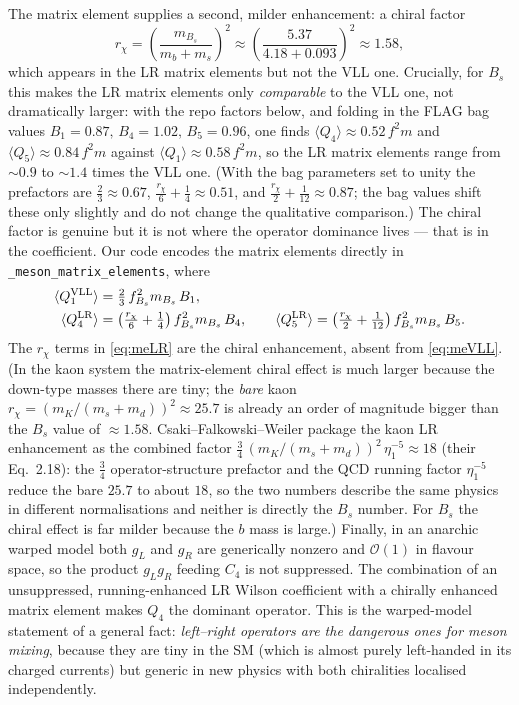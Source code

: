 \documentclass[11pt]{article}
\newcommand{\code}[1]{\texttt{#1}}
\newcommand{\Bs}{B_s}
\theoremstyle{definition}
\begin{document}
The matrix element supplies a second, milder enhancement: a chiral factor
\[
r_\chi = \left(\frac{m_{\Bs}}{m_b+m_s}\right)^2 \approx
\left(\frac{5.37}{4.18+0.093}\right)^2 \approx 1.58,
\]
which appears in the LR matrix elements but not the VLL one. Crucially, for
$\Bs$ this makes the LR matrix elements only \emph{comparable} to the VLL one,
not dramatically larger: with the repo factors below, and folding in the FLAG
bag values $B_1=0.87,\,B_4=1.02,\,B_5=0.96$, one finds
$\langle Q_4\rangle \approx 0.52\,f^2 m$ and
$\langle Q_5\rangle \approx 0.84\,f^2 m$ against
$\langle Q_1\rangle \approx 0.58\,f^2 m$, so
the LR matrix elements range from $\sim 0.9$ to $\sim 1.4$ times the VLL one.
(With the bag parameters set to unity the prefactors are
$\tfrac23\approx0.67$, $\tfrac{r_\chi}{6}+\tfrac14\approx0.51$, and
$\tfrac{r_\chi}{2}+\tfrac1{12}\approx0.87$; the bag values shift these only
slightly and do not change the qualitative comparison.)
The chiral factor is genuine but it is not where the operator dominance lives ---
that is in the coefficient. Our code encodes the matrix elements directly in
\code{\_meson\_matrix\_elements}, where
\begin{align}
\langle Q_1^{\rm VLL}\rangle &= \tfrac23\, f_{\Bs}^2 m_{\Bs}\, B_1,
\label{eq:meVLL}\\
\langle Q_4^{\rm LR}\rangle &= \big(\tfrac{r_\chi}{6}+\tfrac14\big)\,
f_{\Bs}^2 m_{\Bs}\, B_4,\qquad
\langle Q_5^{\rm LR}\rangle = \big(\tfrac{r_\chi}{2}+\tfrac{1}{12}\big)\,
f_{\Bs}^2 m_{\Bs}\, B_5 .
\label{eq:meLR}
\end{align}
The $r_\chi$ terms in \eqref{eq:meLR} are the chiral enhancement, absent from
\eqref{eq:meVLL}. (In the kaon system the matrix-element chiral effect is much
larger because the down-type masses there are tiny; the \emph{bare} kaon
$r_\chi = (m_K/(m_s+m_d))^2 \approx 25.7$ is already an order of magnitude bigger
than the $\Bs$ value of $\approx 1.58$. Csaki--Falkowski--Weiler package the
kaon LR enhancement as the combined factor
$\tfrac34\,(m_K/(m_s+m_d))^2\,\eta_1^{-5} \approx 18$ (their Eq.~2.18): the
$\tfrac34$ operator-structure prefactor and the QCD running factor $\eta_1^{-5}$
reduce the bare $25.7$ to about $18$, so the two numbers describe the same
physics in different normalisations and neither is directly the $\Bs$ number.
For $\Bs$ the chiral effect is far milder because the $b$ mass is large.) Finally, in an anarchic warped model both $g_L$ and $g_R$ are generically
nonzero and $\mathcal{O}(1)$ in flavour space, so the product $g_L g_R$ feeding
$C_4$ is not suppressed. The combination of an unsuppressed, running-enhanced LR
Wilson coefficient with a chirally enhanced matrix element makes $Q_4$ the
dominant operator. This is the warped-model statement of a general fact:
\emph{left--right operators are the dangerous ones for meson mixing}, because
they are tiny in the SM (which is almost purely left-handed in its charged
currents) but generic in new physics with both chiralities localised
independently.
\end{document}

